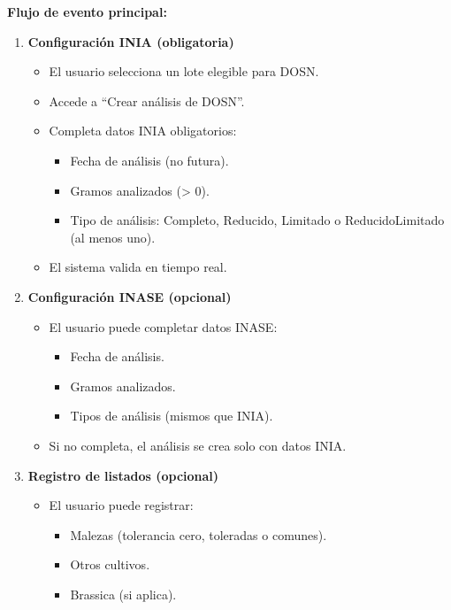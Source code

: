 \vspace{0.5em}
\noindent\textbf{Flujo de evento principal:}
\begin{enumerate}[nosep]
    \item \textbf{Configuración INIA (obligatoria)}
    \begin{itemize}[nosep]
        \item El usuario selecciona un lote elegible para DOSN.
        \item Accede a ``Crear análisis de DOSN''.
        \item Completa datos INIA obligatorios:
        \begin{itemize}[nosep]
            \item Fecha de análisis (no futura).
            \item Gramos analizados (> 0).
            \item Tipo de análisis: Completo, Reducido, Limitado o ReducidoLimitado (al menos uno).
        \end{itemize}
        \item El sistema valida en tiempo real.
    \end{itemize}
    \item \textbf{Configuración INASE (opcional)}
    \begin{itemize}[nosep]
        \item El usuario puede completar datos INASE:
        \begin{itemize}[nosep]
            \item Fecha de análisis.
            \item Gramos analizados.
            \item Tipos de análisis (mismos que INIA).
        \end{itemize}
        \item Si no completa, el análisis se crea solo con datos INIA.
    \end{itemize}
    \item \textbf{Registro de listados (opcional)}
    \begin{itemize}[nosep]
        \item El usuario puede registrar:
        \begin{itemize}[nosep]
            \item Malezas (tolerancia cero, toleradas o comunes).
            \item Otros cultivos.
            \item Brassica (si aplica).
        \end{itemize}

\end{itemize}
\end{enumerate}
